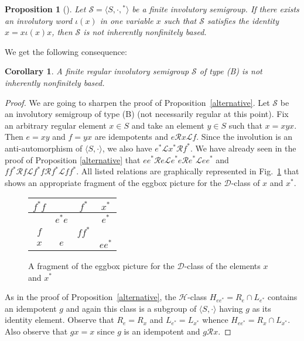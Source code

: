 \documentclass[smallextended]{svjour3}
\def\Rc{\mathrel{\mathscr{R}}}
\def\Lc{\mathrel{\mathscr{L}}}
\newcommand{\fis}{finite involutory semi\-group}
\newcommand{\infb}{inherently non\-finitely based}
\newtheorem{Prop}[Thm]{Proposition}
\newtheorem{Cor}[Thm]{Corollary}
\begin{document}
\begin{Prop}[{\mdseries\cite[Proposition~2.9]{ADV:2012}}]
\label{NINFB} Let $\mathcal{S}=\langle S,\cdot,{}^*\rangle$ be a \fis. If there exists an involutory word $\iota\!(x)$ in one variable $x$ such
that $\mathcal{S}$ satisfies the identity $x=x\iota\!(x)x$, then $\mathcal{S}$ is not \infb.
\end{Prop}
We get the following consequence:
\begin{Cor}\label{regular}
A finite regular involutory semigroup $\mathcal{S}$ of type (B) is not inherently nonfinitely based.
\end{Cor}
\begin{proof}
We are going to sharpen the proof of Proposition~\ref{alternative}. Let $\mathcal{S}$ be an  involutory semigroup of type (B) (not
necessarily regular at this point). Fix an arbitrary regular element $x\in S$  and take an element $y\in S$   such that $x=xyx$. Then
$e=xy$ and $f=yx$ are idempotents and $e\Rc x\Lc f$. Since the involution is an anti-automorphism of $\langle S,\cdot\rangle$, we also have
$e^*\Lc x^*\Rc f^*$. We have already seen in the proof of Proposition \ref{alternative} that $ee^*\Rc e\Lc e^*e\Rc e^*\Lc ee^*$ and
$ff^*\Rc f\Lc f^*f\Rc f^*\Lc ff^*$.  All listed relations are graphically represented in Fig.~\ref{fig:D-class} that shows an appropriate
fragment of the eggbox picture for the $\mathscr{D}$-class of $x$ and $x^*$.
\begin{figure}[th]
\begin{center}
{\large \begin{tabular}{|c|c|c|c|}

\hline $f^*f$\rule[-5pt]{0pt}{16pt} & & $f^*$ & $x^*$ \\
\hline \rule[-5pt]{0pt}{16pt}& $e^*e$  & & $e^*$\\
\hline $f$\rule[-5pt]{0pt}{16pt} & \phantom{$f^*f$} & $ff^*$ &  \phantom{$f^*f$}\\
\hline $x$\rule[-5pt]{0pt}{16pt} & $e$ & & $ee^*$\\
\hline
\end{tabular}}
\caption{A fragment of the eggbox picture for the $\mathscr{D}$-class of the elements $x$ and $x^*$}\label{fig:D-class}
\end{center}
\end{figure}

As in the proof of Proposition~\ref{alternative}, the $\mathscr{H}$-class $H_{ee^*}=R_e\cap L_{e^*}$ contains an idempotent $g$ and again
this class is a subgroup of $\langle S,\cdot\rangle$ having $g$ as its identity element. Observe that $R_e=R_x$ and $L_{e^*}=L_{x^*}$
whence $H_{ee^*}=R_x\cap L_{x^*}$. Also observe that $gx=x$ since $g$ is an idempotent and $g\Rc x$.


\end{proof}
\end{document}
